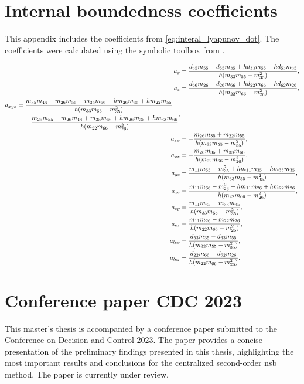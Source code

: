 \chapter{Internal boundedness coefficients}\label{appendix:coefficients}
This appendix includes the coefficients from \eqref{eq:interal_lyapunov_dot}. The coefficients were calculated using the symbolic toolbox from \cite{matlab_symbolic_2022}.

\begingroup
\allowdisplaybreaks
\begin{subequations}
\begin{align}
    a_y &= \frac{d_{35}m_{55} - d_{55}m_{35} + hd_{33}m_{55} - hd_{53}m_{35}}{h(m_{33}m_{55}-m_{35}^2)},\\
    a_z &= \frac{d_{66}m_{26}-d_{26}m_{66} + hd_{22}m_{66} - hd_{62}m_{26}}{h(m_{22}m_{66}- m_{26}^2)},\\
    \begin{split}
        a_{xyz} &= \frac{m_{35}m_{44} - m_{26}m_{55} - m_{35}m_{66} + hm_{26}m_{35} + hm_{22}m_{55}}{h(m_{33}m_{55}-m_{35}^2)}\\
        &\hphantom{=}\;- \frac{m_{26}m_{55} - m_{26}m_{44} + m_{35}m_{66} + hm_{26}m_{35} + hm_{33}m_{66}}{h(m_{22}m_{66}- m_{26}^2)}
    \end{split},\\
    a_{xy} &= -\frac{m_{26}m_{35} + m_{22}m_{55}}{h(m_{33}m_{55}- m_{35}^2)},\\
    a_{xz} &= -\frac{m_{26}m_{35} + m_{33}m_{66}}{h(m_{22}m_{66}- m_{26}^2)},\\
    a_{ye} &= \frac{m_{11}m_{55} - m_{35}^2 + hm_{11}m_{35} - hm_{33}m_{35}}{h(m_{33}m_{55}- m_{35}^2)},\\
    a_{ze} &= \frac{m_{11}m_{66} - m_{26}^2 - hm_{11}m_{26} + hm_{22}m_{26}}{h(m_{22}m_{66}- m_{26}^2)},\\
    a_{ey} &= \frac{m_{11}m_{35} - m_{33}m_{35}}{h(m_{33}m_{55}- m_{35}^2)},\\
    a_{ez} &= \frac{m_{11}m_{26} - m_{22}m_{26}}{h(m_{22}m_{66}- m_{26}^2)},\\
    a_{ley} &= \frac{d_{53}m_{35} - d_{33}m_{55}}{h(m_{33}m_{55}- m_{35}^2)},\\
    a_{lez} &= \frac{d_{22}m_{66} - d_{62}m_{26}}{h(m_{22}m_{66}- m_{26}^2)}.
\end{align}
\end{subequations}
\endgroup

\chapter{Conference paper CDC 2023}\label{cha:conference_paper}

This master's thesis is accompanied by a conference paper submitted to the Conference on Decision and Control 2023. The paper provides a concise presentation of the preliminary findings presented in this thesis, highlighting the most important results and conclusions for the centralized second-order \gls{nsb} method. The paper is currently under review.

